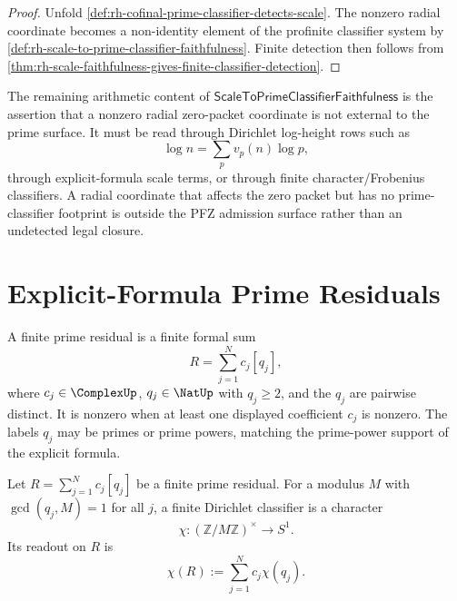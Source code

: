 \begin{proof}
Unfold \autoref{def:rh-cofinal-prime-classifier-detects-scale}.  The
nonzero radial coordinate becomes a non-identity element of the
profinite classifier system by
\autoref{def:rh-scale-to-prime-classifier-faithfulness}.  Finite
detection then follows from
\autoref{thm:rh-scale-faithfulness-gives-finite-classifier-detection}.
\end{proof}

\begin{principle}
\label{prin:rh-scale-faithfulness-arithmetic-content}
The remaining arithmetic content of
$\mathsf{ScaleToPrimeClassifierFaithfulness}$ is the assertion that a
nonzero radial zero-packet coordinate is not external to the prime
surface.  It must be read through Dirichlet log-height rows such as
$$
\log n=\sum_p v_p(n)\log p,
$$
through explicit-formula scale terms, or through finite
character/Frobenius classifiers.  A radial coordinate that affects the
zero packet but has no prime-classifier footprint is outside the PFZ
admission surface rather than an undetected legal closure.
\end{principle}

\section{Explicit-Formula Prime Residuals}
\label{sec:rh-explicit-formula-prime-residuals}

\begin{definition}
\label{def:rh-finite-prime-residual}
A finite prime residual is a finite formal sum
$$
R=\sum_{j=1}^{N}c_j[q_j],
$$
where $c_j\in\ComplexUp$, $q_j\in\NatUp$ with $q_j\ge2$, and the
$q_j$ are pairwise distinct.  It is nonzero when at least one displayed
coefficient $c_j$ is nonzero.  The labels $q_j$ may be primes or prime
powers, matching the prime-power support of the explicit formula.
\end{definition}

\begin{definition}
\label{def:rh-finite-dirichlet-classifier-readout}
Let $R=\sum_{j=1}^{N}c_j[q_j]$ be a finite prime residual.  For a modulus
$M$ with $\gcd(q_j,M)=1$ for all $j$, a finite Dirichlet classifier is a
character
$$
\chi:(\mathbb Z/M\mathbb Z)^{\times}\to S^1.
$$
Its readout on $R$ is
$$
\chi(R):=\sum_{j=1}^{N}c_j\chi(q_j).
$$
\end{definition}

